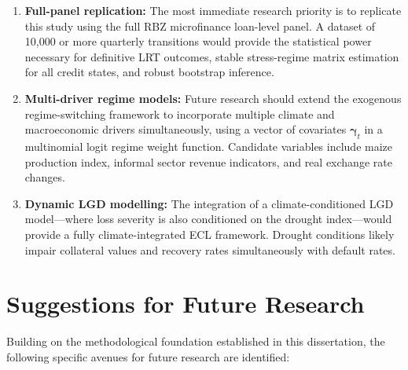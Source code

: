 \documentclass[12pt,a4paper]{article}
\begin{document}
\begin{enumerate}[noitemsep]
    \item \textbf{Full-panel replication:} The most immediate research priority is to replicate this study using the full RBZ microfinance loan-level panel. A dataset of 10,000 or more quarterly transitions would provide the statistical power necessary for definitive LRT outcomes, stable stress-regime matrix estimation for all credit states, and robust bootstrap inference.

    \item \textbf{Multi-driver regime models:} Future research should extend the exogenous regime-switching framework to incorporate multiple climate and macroeconomic drivers simultaneously, using a vector of covariates $\boldsymbol{\gamma}_t$ in a multinomial logit regime weight function. Candidate variables include maize production index, informal sector revenue indicators, and real exchange rate changes.

    \item \textbf{Dynamic LGD modelling:} The integration of a climate-conditioned LGD model---where loss severity is also conditioned on the drought index---would provide a fully climate-integrated ECL framework. Drought conditions likely impair collateral values and recovery rates simultaneously with default rates.
\end{enumerate}

\section{Suggestions for Future Research}

Building on the methodological foundation established in this dissertation, the following specific avenues for future research are identified:
\end{document}
